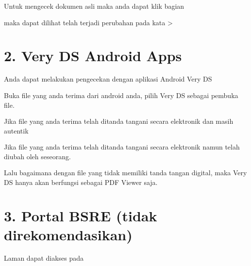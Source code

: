 \documentclass[letterpaper,10pt,bahasai]{sphinxmanual}
\begin{document}
\noindent{}

Untuk mengecek dokumen asli maka anda dapat klik bagian 

\noindent{}

\noindent{}

maka dapat dilihat telah terjadi perubahan pada kata  \sphinxhyphen{}\textgreater{} 

\noindent{}


\section{2. Very DS \sphinxhyphen{} Android Apps}
\label{\detokenize{verifikasi:very-ds-android-apps}}
Anda dapat melakukan pengecekan dengan aplikasi Android Very DS

\noindent{}

Buka file yang anda terima dari android anda, pilih Very DS sebagai pembuka file.

\noindent{}

Jika file yang anda terima telah ditanda tangani secara elektronik dan masih autentik

\noindent{}

Jika file yang anda terima telah ditanda tangani secara elektronik namun telah diubah oleh seseorang.

\noindent{}

Lalu bagaimana dengan file yang tidak memiliki tanda tangan digital, maka Very DS hanya akan berfungsi sebagai PDF Viewer saja.

\noindent{}


\section{3. Portal BSRE (tidak direkomendasikan)}
\label{\detokenize{verifikasi:portal-bsre-tidak-direkomendasikan}}
Laman dapat diakses pada 

\noindent{}
\end{document}
